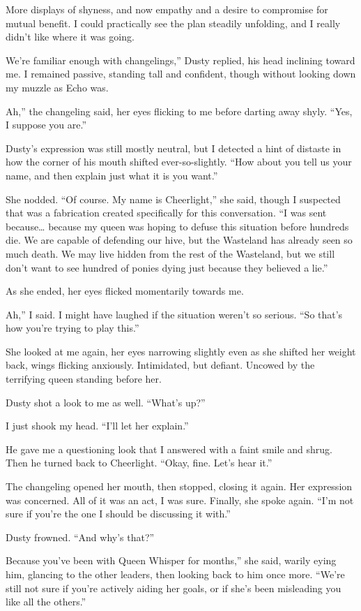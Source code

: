 More displays of shyness, and now empathy and a desire to compromise for mutual benefit. I could practically see the plan steadily unfolding, and I really didn’t like where it was going.

\leavevmode{}We’re familiar enough with changelings,” Dusty replied, his head inclining toward me. I remained passive, standing tall and confident, though without looking down my muzzle as Echo was.

\leavevmode{}Ah,” the changeling said, her eyes flicking to me before darting away shyly. “Yes, I suppose you are.”

Dusty’s expression was still mostly neutral, but I detected a hint of distaste in how the corner of his mouth shifted ever-so-slightly. “How about you tell us your name, and then explain just what it is you want.”

She nodded. “Of course. My name is Cheerlight,” she said, though I suspected that was a fabrication created specifically for this conversation. “I was sent because… because my queen was hoping to defuse this situation before hundreds die. We are capable of defending our hive, but the Wasteland has already seen so much death. We may live hidden from the rest of the Wasteland, but we still don’t want to see hundred of ponies dying just because they believed a lie.”

As she ended, her eyes flicked momentarily towards me.

\leavevmode{}Ah,” I said. I might have laughed if the situation weren’t so serious. “So that’s how you’re trying to play this.”

She looked at me again, her eyes narrowing slightly even as she shifted her weight back, wings flicking anxiously. Intimidated, but defiant. Uncowed by the terrifying queen standing before her.

Dusty shot a look to me as well. “What’s up?”

I just shook my head. “I’ll let her explain.”

He gave me a questioning look that I answered with a faint smile and shrug. Then he turned back to Cheerlight. “Okay, fine. Let’s hear it.”

The changeling opened her mouth, then stopped, closing it again. Her expression was concerned. All of it was an act, I was sure. Finally, she spoke again. “I’m not sure if you’re the one I should be discussing it with.”

Dusty frowned. “And why’s that?”

\leavevmode{}Because you’ve been with Queen Whisper for months,” she said, warily eying him, glancing to the other leaders, then looking back to him once more. “We’re still not sure if you’re actively aiding her goals, or if she’s been misleading you like all the others.”

